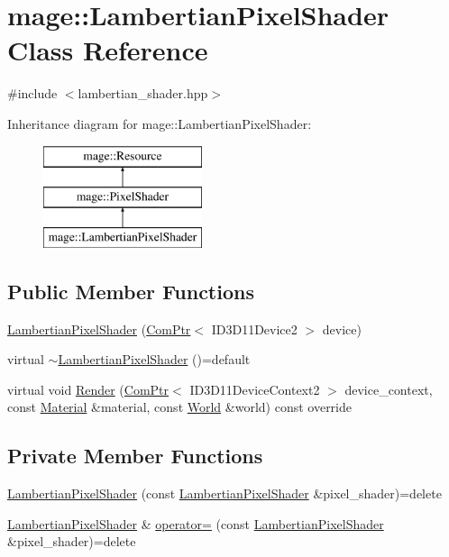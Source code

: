 \hypertarget{classmage_1_1_lambertian_pixel_shader}{}\section{mage\+:\+:Lambertian\+Pixel\+Shader Class Reference}
\label{classmage_1_1_lambertian_pixel_shader}


{\ttfamily \#include $<$lambertian\+\_\+shader.\+hpp$>$}

Inheritance diagram for mage\+:\+:Lambertian\+Pixel\+Shader\+:\begin{figure}[H]
\begin{center}
\leavevmode
\includegraphics[height=3.000000cm]{classmage_1_1_lambertian_pixel_shader}
\end{center}
\end{figure}
\subsection*{Public Member Functions}
\begin{DoxyCompactItemize}
\item 
\hyperlink{classmage_1_1_lambertian_pixel_shader_a311a8f1c511a0066a4fe6d9c29b97d1c}{Lambertian\+Pixel\+Shader} (\hyperlink{namespacemage_ae74f374780900893caa5555d1031fd79}{Com\+Ptr}$<$ I\+D3\+D11\+Device2 $>$ device)
\item 
virtual \hyperlink{classmage_1_1_lambertian_pixel_shader_aedea7342ae95c6532a086fb28978b5b0}{$\sim$\+Lambertian\+Pixel\+Shader} ()=default
\item 
virtual void \hyperlink{classmage_1_1_lambertian_pixel_shader_a9fc8db84f2cd8f6e5722e7436e72e407}{Render} (\hyperlink{namespacemage_ae74f374780900893caa5555d1031fd79}{Com\+Ptr}$<$ I\+D3\+D11\+Device\+Context2 $>$ device\+\_\+context, const \hyperlink{structmage_1_1_material}{Material} \&material, const \hyperlink{classmage_1_1_world}{World} \&world) const override
\end{DoxyCompactItemize}
\subsection*{Private Member Functions}
\begin{DoxyCompactItemize}
\item 
\hyperlink{classmage_1_1_lambertian_pixel_shader_a0e7a36645bb7e1fa9bd481575886ddad}{Lambertian\+Pixel\+Shader} (const \hyperlink{classmage_1_1_lambertian_pixel_shader}{Lambertian\+Pixel\+Shader} \&pixel\+\_\+shader)=delete
\item 
\hyperlink{classmage_1_1_lambertian_pixel_shader}{Lambertian\+Pixel\+Shader} \& \hyperlink{classmage_1_1_lambertian_pixel_shader_a03ae64ef13e62b33c6b6ac306207a045}{operator=} (const \hyperlink{classmage_1_1_lambertian_pixel_shader}{Lambertian\+Pixel\+Shader} \&pixel\+\_\+shader)=delete
\end{DoxyCompactItemize}
